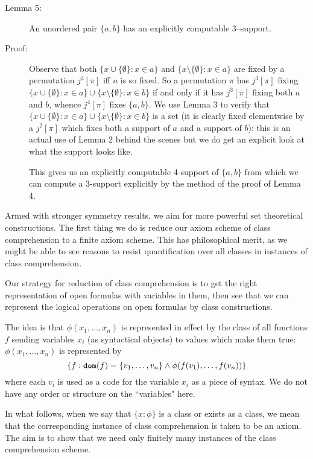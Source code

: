 \documentclass[12pt]{article}
\begin{document}
\begin{description}


\item[Lemma 5:]  An unordered pair $\{a,b\}$ has an explicitly computable 3--support.

\item[Proof:]  Observe that both $\{x \cup \{\emptyset\} :x \in a\}$ and $\{x \setminus \{\emptyset\}:x \in a\}$ are fixed by a permutation $j^3[\pi]$ iff $a$ is so fixed.  So a permutation $\pi$ has $j^3[\pi]$ fixing $\{x \cup \{\emptyset\} :x \in a\} \cup \{x \setminus \{\emptyset\}:x \in b\}$
if and only if it has $j^3[\pi]$ fixing both $a$ and $b$, whence $j^4[\pi]$ fixes $\{a,b\}$.  We use Lemma 3 to verify that $\{x \cup \{\emptyset\} :x \in a\} \cup \{x \setminus \{\emptyset\}:x \in b\}$ is a set (it is clearly fixed elementwise by a $j^2[\pi]$ which fixes both a support of $a$ and a support of $b$): this is an actual use of Lemma 2 behind the scenes but we do get an explicit look at what the support looks like.

This gives us an explicitly computable 4-support of $\{a,b\}$ from which we can compute a 3-support explicitly by the method of the proof of Lemma 4.



\end{description}

Armed with stronger symmetry results, we aim for more powerful set theoretical constructions.  The first thing we do is reduce our 
axiom scheme of class comprehension to a finite axiom scheme.  This has philosophical merit, as we might be able to see reasons to resist
quantification over all classes in instances of class comprehension.

Our strategy for reduction of class comprehension is to get the right representation of open formulas with variables in them, then see that we can represent the logical operations on open formulas by class constructions.

The idea is that $\phi(x_1,\ldots,x_n)$ is represented in effect by the class of all functions $f$ sending variables $x_i$ (as syntactical objects) to values which make them true:  $\phi(x_1,\ldots,x_n)$ is represented by
$$\{f:{\tt dom}(f)=\{v_1,\ldots,v_n\} \wedge \phi(f(v_1),\ldots,f(v_n))\}$$ where each $v_i$ is used as a code for the variable $x_i$ as a piece of syntax.  We do not have any order or structure on the ``variables" here.

In what follows, when we say that $\{x:\phi\}$ is a class or exists as a class, we mean that the corresponding instance of class comprehension is taken to be an axiom.  The aim is to show that we need only finitely many instances of the class comprehension scheme.
\end{document}
